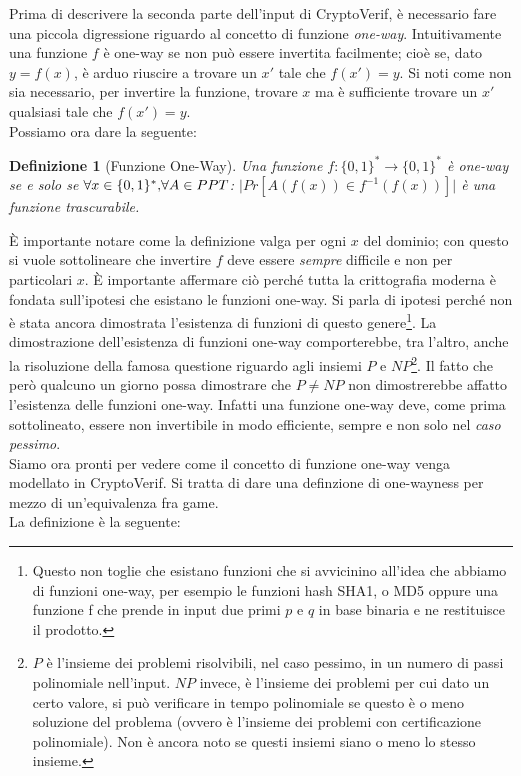 \documentclass[a4paper,openright,twoside,12pt]{report}
\newtheorem{definizione}{Definizione}[chapter]
\begin{document}
Prima di descrivere la seconda parte dell'input di CryptoVerif, \`e necessario fare una piccola digressione riguardo al concetto di funzione \emph{one-way}.
Intuitivamente una funzione $f$ \`e one-way se non pu\`o essere invertita facilmente; cio\`e se, dato $y=f(x)$, \`e arduo riuscire a trovare un $x'$ tale che $f(x')=y$. 
Si noti come non sia necessario, per invertire la funzione, trovare $x$ ma \`e sufficiente trovare un $x'$ qualsiasi tale che $f(x')=y$.
\\Possiamo ora dare la seguente:
\begin{definizione}[Funzione One-Way]
Una funzione $f: \{0,1\}^*\rightarrow \{0,1\}^*$ \`e one-way se e solo se $\forall x \in  \{0,1\}^* \hbox{,} \forall A \in PPT$:  $\lvert Pr[A(f(x)) \in f^{-1}(f(x))]\rvert$ \`e una funzione 
trascurabile.
\end{definizione}

\`E importante notare come la definizione valga per ogni $x$ del dominio; con questo si vuole sottolineare che invertire $f$ deve essere \emph{sempre} difficile e non per particolari $x$.
\`E importante affermare ci\`o perch\'e tutta la crittografia moderna \`e fondata sull'ipotesi che esistano le funzioni one-way.
Si parla di ipotesi perch\'e non \`e stata ancora dimostrata l'esistenza di funzioni di questo genere\footnote{Questo non toglie
che esistano funzioni che si avvicinino all'idea che abbiamo di funzioni one-way, per esempio le funzioni hash SHA1, o MD5 oppure una funzione
f che prende in input due primi $p$ e $q$ in base binaria e ne restituisce il prodotto.}.
La dimostrazione dell'esistenza di funzioni one-way comporterebbe, tra l'altro, anche la risoluzione della famosa questione riguardo agli insiemi
$P$ e $NP$\footnote{$P$ \`e l'insieme dei problemi risolvibili, nel caso pessimo, in un numero di passi polinomiale nell'input. $NP$ invece, \`e l'insieme dei problemi per cui dato un certo valore, 
si pu\`o verificare in tempo polinomiale se questo \`e o meno soluzione del problema (ovvero \`e l'insieme dei problemi con certificazione polinomiale). 
Non \`e ancora noto se questi insiemi siano o meno lo stesso insieme.}.
Il fatto che però qualcuno un giorno possa dimostrare che $P \neq NP$ non dimostrerebbe affatto l'esistenza delle funzioni one-way. 
Infatti una funzione one-way deve, come prima sottolineato, essere non invertibile in modo efficiente, sempre e non solo nel \emph{caso pessimo}. \\ 
Siamo ora pronti per vedere come il concetto di funzione one-way venga modellato in CryptoVerif.
Si tratta di dare una definzione di one-wayness per mezzo di un'equivalenza fra game.\\La definizione \`e la seguente:
\end{document}
